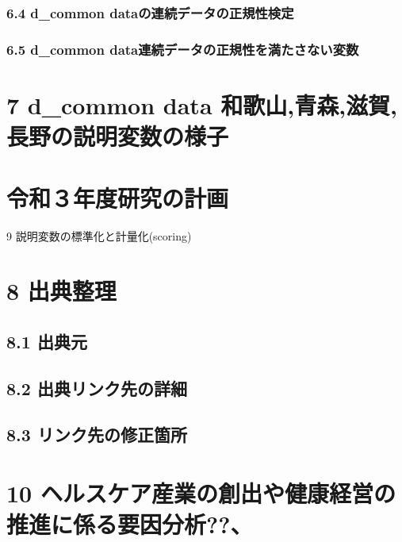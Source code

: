 \subsection{6.4 d\_common dataの連続データの正規性検定}

\subsection{6.5 d\_common data連続データの正規性を満たさない変数}


\chapter{7 d\_common data 和歌山,青森,滋賀,長野の説明変数の様子}







\chapter{令和３年度研究の計画}

9 説明変数の標準化と計量化(scoring)





\chapter{8 出典整理}

\section{8.1 出典元}


\section{8.2 出典リンク先の詳細}



\section{8.3 リンク先の修正箇所}








\chapter{10 ヘルスケア産業の創出や健康経営の推進に係る要因分析??、
}




